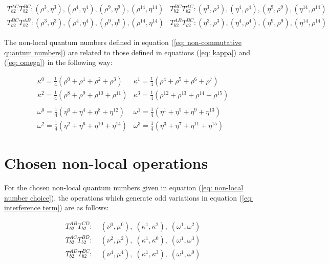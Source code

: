 \documentclass{article}
\begin{document}
\begin{equation}
\begin{array}{ll}
    T^{AC}_{b2}T^{BC}_{b2}:(\rho^3, \eta^3), (\rho^4, \eta^4), (\rho^9, \eta^9), (\rho^{14}, \eta^{14}) &
    T^{BC}_{b2}T^{AC}_{b2}:(\eta^3, \rho^3), (\eta^4, \rho^4), (\eta^9, \rho^9), (\eta^{14}, \rho^{14})\\
    
    T^{BC}_{b2}T^{AB}_{b2}:(\rho^3, \eta^3), (\rho^4, \eta^4), (\rho^9, \eta^9), (\rho^{14}, \eta^{14}) &
    T^{AB}_{b2}T^{BC}_{b2}:(\eta^3, \rho^3), (\eta^4, \rho^4), (\eta^9, \rho^9), (\eta^{14}, \rho^{14})
\end{array}
\end{equation}

The non-local quantum numbers defined in equation (\ref{eq: non-commutative quantum numbers}) are related to those defined in equations (\ref{eq: kappa}) and (\ref{eq: omega}) in the following way:

\begin{equation}
    \begin{array}{ll}
    \kappa^0 = \frac{1}{4}(\rho^0+\rho^1+\rho^2+\rho^3)&
    \kappa^1 = \frac{1}{4}(\rho^4+\rho^5+\rho^6+\rho^7)\\
    \kappa^2 = \frac{1}{4}(\rho^8+\rho^9+\rho^{10}+\rho^{11})&
    \kappa^3 = \frac{1}{4}(\rho^{12}+\rho^{13}+\rho^{14}+\rho^{15})\\
    \\
    \omega^0 = \frac{1}{4}(\eta^0+\eta^4+\eta^8+\eta^{12})&
    \omega^1 = \frac{1}{4}(\eta^1+\eta^5+\eta^9+\eta^{13})\\
    \omega^2 = \frac{1}{4}(\eta^2+\eta^6+\eta^{10}+\eta^{14})&
    \omega^3 = \frac{1}{4}(\eta^3+\eta^7+\eta^{11}+\eta^{15})
    \end{array}
\end{equation}


\section{Chosen non-local operations \label{sec: Chosen non-local operations}}

For the chosen non-local quantum numbers given in equation (\ref{eq: non-local number choice}), the operations which generate odd variations in equation (\ref{eq: interference term}) are as follows:

   \begin{equation}
\begin{array}{ll}
    T^{AB}_{b2}T^{CD}_{b2}: & \; (\nu^0, \mu^0), \; (\kappa^1,\kappa^2), \; (\omega^1,\omega^2)\\
    
    T^{AC}_{b2}T^{BD}_{b2}: & \; (\nu^2, \mu^2), \; (\kappa^1,\kappa^0), \; (\omega^1,\omega^3)\\
    
    T^{AD}_{b2}T^{BC}_{b2}: & \; (\nu^4, \mu^4), \; (\kappa^1,\kappa^3),\;(\omega^1, \omega^0)\\
    
\end{array}
\end{equation}
\end{document}
